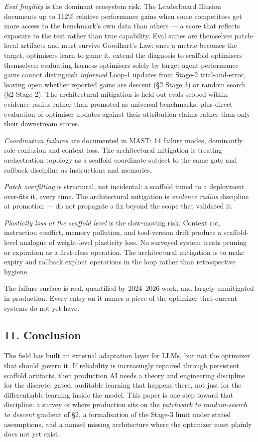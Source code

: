 \emph{Eval fragility} is the dominant ecosystem risk. The Leaderboard
Illusion documents up to 112\% relative performance gains when some
competitors get more access to the benchmark's own data than others ---
a score that reflects exposure to the test rather than true capability.
Eval suites are themselves patch-local artifacts and must survive
Goodhart's Law: once a metric becomes the target, optimisers learn to
game it. \citet{ong2026harnesseval} extend the diagnosis to scaffold
optimisers themselves: evaluating harness optimisers solely by
target-agent performance gains cannot distinguish \emph{informed} Loop-1
updates from Stage-2 trial-and-error, leaving open whether reported
gains are descent (§2 Stage 3) or random search (§2 Stage 2). The
architectural mitigation is held-out evals scoped within evidence radius
rather than promoted as universal benchmarks, plus direct evaluation of
optimiser updates against their attribution claims rather than only
their downstream scores.

\emph{Coordination failures} are documented in MAST: 14 failure modes,
dominantly role-confusion and context-loss.
The architectural mitigation is treating orchestration topology as a
scaffold coordinate subject to the same gate and rollback discipline as
instructions and memories.

\emph{Patch overfitting} is structural, not incidental: a scaffold tuned
to a deployment over-fits it, every time. The architectural mitigation
is \emph{evidence radius} discipline at promotion --- do not propagate a
fix beyond the scope that validated it.

\emph{Plasticity loss at the scaffold level} is the slow-moving risk.
Context rot, instruction conflict, memory pollution, and tool-version
drift produce a scaffold-level analogue of weight-level plasticity loss.
No surveyed system treats pruning or expiration as a first-class
operation. The architectural mitigation is to make expiry and rollback
explicit operations in the loop rather than retrospective hygiene.

The failure surface is real, quantified by 2024--2026 work, and largely
unmitigated in production. Every entry on it names a piece of the
optimizer that current systems do not yet have.

\subsection{11. Conclusion}\label{conclusion}

The field has built an external adaptation layer for LLMs, but not the
optimizer that should govern it. If reliability is increasingly repaired
through persistent scaffold artifacts, then production AI needs a theory
and engineering discipline for the discrete, gated, auditable learning
that happens there, not just for the differentiable learning inside the
model. This paper is one step toward that discipline: a survey of where
production sits on the \emph{patchwork to random-search to descent}
gradient of §2, a formalisation of the Stage-3 limit under stated
assumptions, and a named missing architecture where the optimizer most
plainly does not yet exist.

